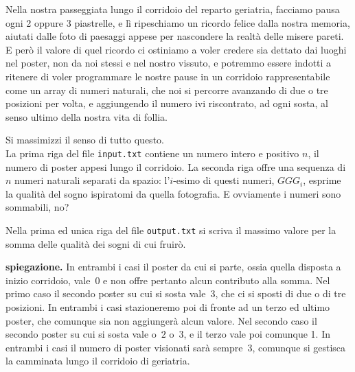 \renewcommand{\nomebreve}{two\_three\_steps}
\renewcommand{\titolo}{Better two or three steps?}

\introduzione{}

Nella nostra passeggiata lungo il corridoio del reparto geriatria,
facciamo pausa ogni 2 oppure 3 piastrelle, e lì ripeschiamo un ricordo felice dalla nostra memoria, aiutati dalle foto di paesaggi appese per nascondere la realtà delle misere pareti.
E però il valore di quel ricordo ci ostiniamo a voler credere sia dettato dai luoghi nel poster, non da noi stessi e nel nostro vissuto, e potremmo essere indotti a ritenere di voler programmare le nostre pause in un corridoio rappresentabile come un array di numeri naturali, che noi si percorre avanzando di due o tre posizioni per volta, e aggiungendo il numero ivi riscontrato, ad ogni sosta, al senso ultimo della nostra vita di follia.


  Si massimizzi il senso di tutto questo.\\


La prima riga del file \verb'input.txt' contiene un numero intero e positivo $n$, il numero di poster appesi lungo il corridoio.
La seconda riga offre una sequenza di $n$ numeri naturali separati da spazio:
l'$i$-esimo di questi numeri, $GGG_i$, esprime la qualità del sogno ispiratomi da quella fotografia. E ovviamente i numeri sono sommabili, no?

Nella prima ed unica riga del file \verb'output.txt'
si scriva il massimo valore per la somma delle qualità dei sogni di cui fruirò.\\



{\bf spiegazione.} In entrambi i casi il poster da cui si parte, ossia quella disposta a inizio corridoio, vale~$0$ e non offre pertanto alcun contributo alla somma.
Nel primo caso il secondo poster su cui si sosta vale~$3$, che ci si sposti di due o di tre posizioni. In entrambi i casi stazioneremo poi di fronte ad un terzo ed ultimo poster, che comunque sia non aggiungerà alcun valore.
Nel secondo caso il secondo poster su cui si sosta vale o~$2$ o~$3$, e il terzo vale poi comunque 1.
In entrambi i casi il numero di poster visionati sarà sempre~3, comunque si gestisca la camminata lungo il corridoio di geriatria.


